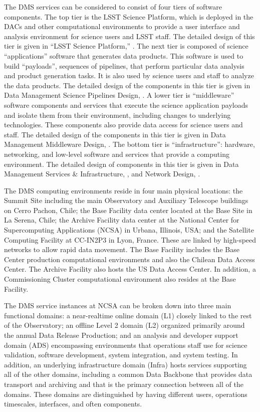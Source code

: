 \documentclass[DM,toc]{lsstdoc}
\begin{document}
The DMS services can be considered to consist of four tiers of software
components. The top tier is the LSST Science Platform, which is deployed
in the DACs and other computational environments to provide a user
interface and analysis environment for science users and LSST staff. The
detailed design of this tier is given in ``LSST Science Platform,'' . The next
tier is composed of science ``applications'' software that generates
data products. This software is used to build ``payloads'', sequences of
pipelines, that perform particular data analysis and product generation
tasks. It is also used by science users and staff to analyze the data
products. The detailed design of the components in this tier is given in
Data Management Science Pipelines Design, . A lower tier is
``middleware'' software components and services that execute the science
application payloads and isolate them from their environment, including
changes to underlying technologies. These components also provide data
access for science users and staff. The detailed design of the
components in this tier is given in Data Management Middleware Design,
. The bottom tier is ``infrastructure'': hardware, networking,
and low-level software and services that provide a computing
environment. The detailed design of components in this tier is given in
Data Management Services \& Infrastructure, , and Network Design,
.

The DMS computing environments reside in four main physical locations:
the Summit Site including the main Observatory and Auxiliary Telescope
buildings on Cerro Pachon, Chile; the Base Facility data center located
at the Base Site in La Serena, Chile; the Archive Facility data center
at the National Center for Supercomputing Applications (NCSA) in Urbana,
Illinois, USA; and the Satellite Computing Facility at CC-IN2P3 in Lyon,
France. These are linked by high-speed networks to allow rapid data
movement. The Base Facility includes the Base Center production
computational environments and also the Chilean Data Access Center.
The Archive Facility also hosts the US Data Access Center.
In
addition, a Commissioning Cluster computational environment also resides
at the Base Facility.

The DMS service instances at NCSA can be broken down into
three main functional domains: a near-realtime online domain (L1)
closely linked to the rest of the Observatory; an offline Level 2 domain
(L2) organized primarily around the annual Data Release Production; and
an analysis and developer support domain (ADS) encompassing environments
that operations staff use for science validation, software development,
system integration, and system testing. In addition, an underlying
infrastructure domain (Infra) hosts services supporting all of the other
domains, including a common Data Backbone that provides data transport
and archiving and that is the primary connection between all of the
domains. These domains are distinguished by having different users,
operations timescales, interfaces, and often components.
\end{document}
